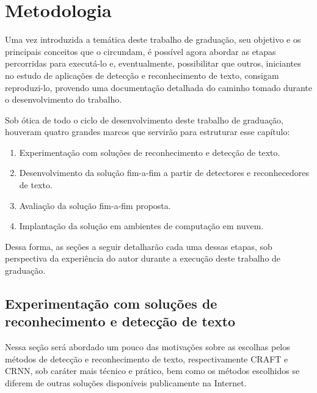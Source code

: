 \chapter{Metodologia}\label{cap:metodologia}

Uma vez introduzida a temática deste trabalho de graduação, seu objetivo e os principais conceitos que o circundam, é possível agora abordar as etapas 
percorridas para executá-lo e, eventualmente, possibilitar que outros, iniciantes no estudo de aplicações de detecção e reconhecimento de texto, 
consigam reproduzi-lo, provendo uma documentação detalhada do caminho tomado durante o desenvolvimento do trabalho.

Sob ótica de todo o ciclo de desenvolvimento deste trabalho de graduação, houveram quatro grandes marcos que servirão para estruturar esse capítulo:

\begin{enumerate}
    \item Experimentação com soluções de reconhecimento e detecção de texto.
    \item Desenvolvimento da solução fim-a-fim a partir de detectores e reconhecedores de texto.
    \item Avaliação da solução fim-a-fim proposta.
    \item Implantação da solução em ambientes de computação em nuvem.
\end{enumerate}


Dessa forma, as seções a seguir detalharão cada uma dessas etapas, sob perspectiva da experiência do autor durante a execução deste 
trabalho de graduação.

\section{Experimentação com soluções de reconhecimento e detecção de texto}\label{sec:metodologia_experimentacao}

Nessa seção será abordado um pouco das motivações sobre as escolhas pelos métodos de detecção e reconhecimento de texto, 
respectivamente CRAFT e CRNN, sob caráter mais técnico e prático, bem como os métodos escolhidos se diferem de outras soluções disponíveis
publicamente na Internet.

